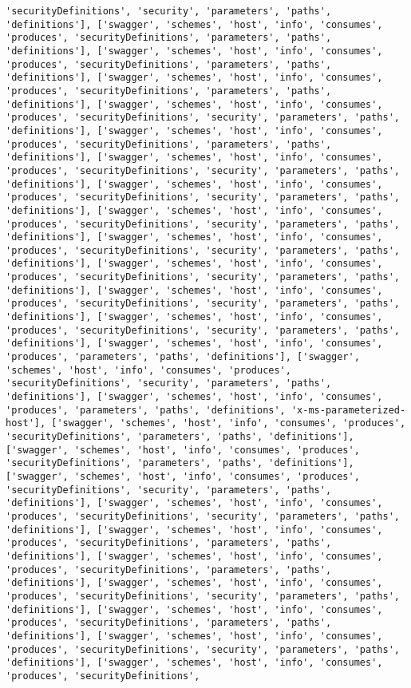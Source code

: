 \documentclass[11pt]{article}
\begin{document}
\begin{Verbatim}[commandchars=\\\{\}]
'securityDefinitions', 'security', 'parameters', 'paths', 'definitions'], ['swagger', 'schemes', 'host', 'info', 'consumes', 'produces', 'securityDefinitions', 'parameters', 'paths', 'definitions'], ['swagger', 'schemes', 'host', 'info', 'consumes', 'produces', 'securityDefinitions', 'parameters', 'paths', 'definitions'], ['swagger', 'schemes', 'host', 'info', 'consumes', 'produces', 'securityDefinitions', 'parameters', 'paths', 'definitions'], ['swagger', 'schemes', 'host', 'info', 'consumes', 'produces', 'securityDefinitions', 'security', 'parameters', 'paths', 'definitions'], ['swagger', 'schemes', 'host', 'info', 'consumes', 'produces', 'securityDefinitions', 'parameters', 'paths', 'definitions'], ['swagger', 'schemes', 'host', 'info', 'consumes', 'produces', 'securityDefinitions', 'security', 'parameters', 'paths', 'definitions'], ['swagger', 'schemes', 'host', 'info', 'consumes', 'produces', 'securityDefinitions', 'security', 'parameters', 'paths', 'definitions'], ['swagger', 'schemes', 'host', 'info', 'consumes', 'produces', 'securityDefinitions', 'security', 'parameters', 'paths', 'definitions'], ['swagger', 'schemes', 'host', 'info', 'consumes', 'produces', 'securityDefinitions', 'security', 'parameters', 'paths', 'definitions'], ['swagger', 'schemes', 'host', 'info', 'consumes', 'produces', 'securityDefinitions', 'security', 'parameters', 'paths', 'definitions'], ['swagger', 'schemes', 'host', 'info', 'consumes', 'produces', 'securityDefinitions', 'security', 'parameters', 'paths', 'definitions'], ['swagger', 'schemes', 'host', 'info', 'consumes', 'produces', 'securityDefinitions', 'security', 'parameters', 'paths', 'definitions'], ['swagger', 'schemes', 'host', 'info', 'consumes', 'produces', 'parameters', 'paths', 'definitions'], ['swagger', 'schemes', 'host', 'info', 'consumes', 'produces', 'securityDefinitions', 'security', 'parameters', 'paths', 'definitions'], ['swagger', 'schemes', 'host', 'info', 'consumes', 'produces', 'parameters', 'paths', 'definitions', 'x-ms-parameterized-host'], ['swagger', 'schemes', 'host', 'info', 'consumes', 'produces', 'securityDefinitions', 'parameters', 'paths', 'definitions'], ['swagger', 'schemes', 'host', 'info', 'consumes', 'produces', 'securityDefinitions', 'parameters', 'paths', 'definitions'], ['swagger', 'schemes', 'host', 'info', 'consumes', 'produces', 'securityDefinitions', 'security', 'parameters', 'paths', 'definitions'], ['swagger', 'schemes', 'host', 'info', 'consumes', 'produces', 'securityDefinitions', 'security', 'parameters', 'paths', 'definitions'], ['swagger', 'schemes', 'host', 'info', 'consumes', 'produces', 'securityDefinitions', 'parameters', 'paths', 'definitions'], ['swagger', 'schemes', 'host', 'info', 'consumes', 'produces', 'securityDefinitions', 'parameters', 'paths', 'definitions'], ['swagger', 'schemes', 'host', 'info', 'consumes', 'produces', 'securityDefinitions', 'security', 'parameters', 'paths', 'definitions'], ['swagger', 'schemes', 'host', 'info', 'consumes', 'produces', 'securityDefinitions', 'parameters', 'paths', 'definitions'], ['swagger', 'schemes', 'host', 'info', 'consumes', 'produces', 'securityDefinitions', 'security', 'parameters', 'paths', 'definitions'], ['swagger', 'schemes', 'host', 'info', 'consumes', 'produces', 'securityDefinitions', 
\end{Verbatim}
\end{document}
